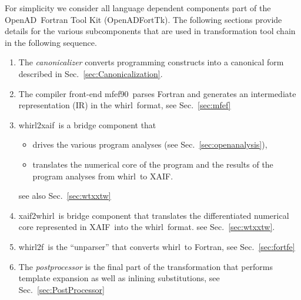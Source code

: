 \documentclass{book}
\newcommand{\mfefninety}{mfef90}
\newcommand{\OpenAD}{OpenAD}
\newcommand{\OpenADFortTk}{OpenADFortTk}
\newcommand{\xaif}{XAIF}
\newcommand{\whirl}{whirl}
\newcommand{\whirlToxaif}{whirl2xaif}
\newcommand{\whirlTof}{whirl2f}
\newcommand{\xaifTowhirl}{xaif2whirl}
\newcommand{\refsec}[1]{{Sec.~\ref{#1}}}
\begin{document}
For simplicity we consider all language dependent components part 
of the \OpenAD\ Fortran Tool Kit (\OpenADFortTk). The following 
sections provide details for the various subcomponents that 
are used in transformation tool chain in the following sequence.
\begin{enumerate}	
\item The {\em canonicalizer} converts  
  programming constructs into a canonical form described in \refsec{sec:Canonicalization}. 

\item The compiler front-end \mfefninety\  parses
  Fortran and generates an intermediate representation (IR)
  in the \whirl\ format, see \refsec{sec:mfef}

\item \whirlToxaif\ is a bridge component that
  \begin{itemize}
  \item drives the various program analyses (see \refsec{sec:openanalysis}),
  \item translates the numerical core of the program and  
    the results of the program analyses from \whirl\ to \xaif.
  \end{itemize} see also \refsec{sec:wtxxtw}

\item \xaifTowhirl\ is bridge component that translates the 
  differentiated numerical core represented in \xaif\ 
  into the \whirl\ format. see \refsec{sec:wtxxtw}.

\item \whirlTof\ is the ``unparser'' that converts \whirl\ to
  Fortran, see \refsec{sec:fortfe}

\item The {\em postprocessor} is the  final part of the transformation that
  performs template expansion as well as inlining substitutions, see \refsec{sec:PostProcessor}

\end{enumerate}

\end{document}
